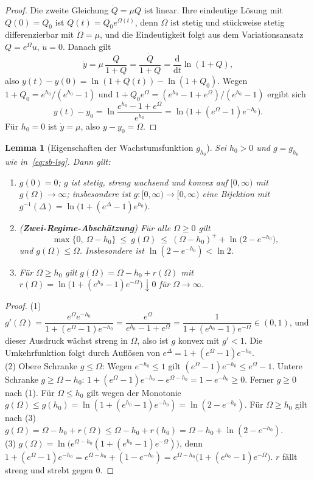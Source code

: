 \documentclass[a4paper, 12pt, twoside, openright]{report}
\newtheorem{lemma}[theorem]{Lemma}
\theoremstyle{definition}
\theoremstyle{definition}
\begin{document}
\begin{proof}
Die zweite Gleichung $\dot Q=\mu Q$ ist linear. Ihre eindeutige Lösung mit $Q(0)=Q_0$ ist
$Q(t)=Q_0e^{\Omega(t)}$, denn $\Omega$ ist stetig und stückweise stetig differenzierbar mit
$\dot\Omega=\mu$, und die Eindeutigkeit folgt aus dem Variationsansatz $Q=e^{\Omega}u$,
$\dot u=0$. Danach gilt
\[
  \dot y=\mu\,\frac{Q}{1+Q}=\frac{\dot Q}{1+Q}=\frac{\mathrm d}{\mathrm dt}\ln(1+Q),
\]
also $y(t)-y(0)=\ln(1+Q(t))-\ln(1+Q_0)$. Wegen $1+Q_0=e^{h_0}/(e^{h_0}-1)$ und
$1+Q_0e^{\Omega}=(e^{h_0}-1+e^{\Omega})/(e^{h_0}-1)$ ergibt sich
\[
  y(t)-y_0=\ln\frac{e^{h_0}-1+e^{\Omega}}{e^{h_0}}
  =\ln\bigl(1+(e^{\Omega}-1)e^{-h_0}\bigr).
\]
Für $h_0=0$ ist $\dot y=\mu$, also $y-y_0=\Omega$.
\end{proof}

\begin{lemma}[Eigenschaften der Wachstumsfunktion $g_{h_0}$]\label{lem:sb-g}
Sei $h_0>0$ und $g=g_{h_0}$ wie in~\eqref{eq:sb-lsg}. Dann gilt:
\begin{enumerate}
  \item $g(0)=0$; $g$ ist stetig, streng wachsend und konvex auf $[0,\infty)$ mit
    $g(\Omega)\to\infty$; insbesondere ist $g:[0,\infty)\to[0,\infty)$ eine Bijektion mit
    $g^{-1}(\Delta)=\ln\bigl(1+(e^{\Delta}-1)e^{h_0}\bigr)$.
  \item (\textbf{Zwei-Regime-Abschätzung}) Für alle $\Omega\ge0$ gilt
    \begin{equation}
      \max\{0,\ \Omega-h_0\}\ \le\ g(\Omega)\ \le\ (\Omega-h_0)^{+}+\ln\bigl(2-e^{-h_0}\bigr),
      \label{eq:sb-zweiregime}
    \end{equation}
    und $g(\Omega)\le\Omega$. Insbesondere ist $\ln(2-e^{-h_0})<\ln 2$.
  \item Für $\Omega\ge h_0$ gilt $g(\Omega)=\Omega-h_0+r(\Omega)$ mit
    $r(\Omega)=\ln\bigl(1+(e^{h_0}-1)e^{-\Omega}\bigr)\downarrow0$ für $\Omega\to\infty$.
\end{enumerate}
\end{lemma}

\begin{proof}
(1) $g'(\Omega)=\dfrac{e^{\Omega}e^{-h_0}}{1+(e^{\Omega}-1)e^{-h_0}}=\dfrac{e^{\Omega}}{e^{h_0}-1+e^{\Omega}}
=\dfrac{1}{1+(e^{h_0}-1)e^{-\Omega}}\in(0,1)$, und dieser Ausdruck wächst streng in
$\Omega$, also ist $g$ konvex mit $g'<1$. Die Umkehrfunktion folgt durch Auflösen von
$e^{\Delta}=1+(e^{\Omega}-1)e^{-h_0}$.\\
(2) Obere Schranke $g\le\Omega$: Wegen $e^{-h_0}\le1$ gilt $(e^{\Omega}-1)e^{-h_0}\le
e^{\Omega}-1$. Untere Schranke $g\ge\Omega-h_0$: $1+(e^{\Omega}-1)e^{-h_0}-e^{\Omega-h_0}
=1-e^{-h_0}\ge0$. Ferner $g\ge0$ nach (1). Für $\Omega\le h_0$ gilt wegen der Monotonie
$g(\Omega)\le g(h_0)=\ln(1+(e^{h_0}-1)e^{-h_0})=\ln(2-e^{-h_0})$. Für $\Omega\ge h_0$ gilt
nach (3) $g(\Omega)=\Omega-h_0+r(\Omega)\le\Omega-h_0+r(h_0)=\Omega-h_0+\ln(2-e^{-h_0})$.\\
(3) $g(\Omega)=\ln\bigl(e^{\Omega-h_0}(1+(e^{h_0}-1)e^{-\Omega})\bigr)$, denn
$1+(e^{\Omega}-1)e^{-h_0}=e^{\Omega-h_0}+(1-e^{-h_0})=e^{\Omega-h_0}\bigl(1+(e^{h_0}-1)e^{-\Omega}\bigr)$.
$r$ fällt streng und strebt gegen $0$.
\end{proof}
\end{document}
